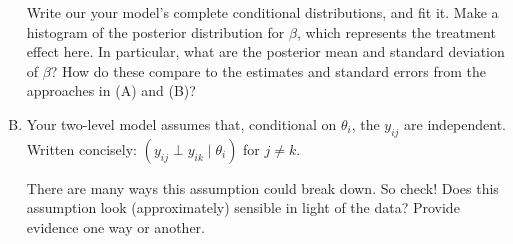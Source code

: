 \documentclass[11pt]{article}
\begin{document}
\begin{enumerate}[(A)]
Write our your model's complete conditional distributions, and fit it.  Make a histogram of the posterior distribution for $\beta$, which represents the treatment effect here.  In particular, what are the posterior mean and standard deviation of $\beta$?  How do these compare to the estimates and standard errors from the approaches in (A) and (B)?  

\item Your two-level model assumes that, conditional on $\theta_i$, the $y_{ij}$ are independent.  Written concisely: $(y_{ij} \perp y_{ik} \mid \theta_i)$ for $j \neq k$. 

There are many ways this assumption could break down.  So check!  Does this assumption look (approximately) sensible in light of the data?  Provide evidence one way or another.  

\end{enumerate}
\end{document}

